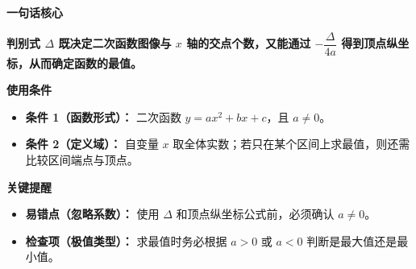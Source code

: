 \begin{summarybox}
	\textbf{\textcolor{CSummary}{一句话核心}}

	\textbf{判别式 $\Delta$ 既决定二次函数图像与 $x$ 轴的交点个数，又能通过 $-\dfrac{\Delta}{4a}$ 得到顶点纵坐标，从而确定函数的最值。}

	\medskip
	\textbf{\textcolor{CSummary}{使用条件}}
	\begin{itemize}[leftmargin=*, itemsep=0.5em, topsep=0.4em]
		\item \textbf{条件 1（函数形式）：} 二次函数 $y=ax^2+bx+c$，且 $a\neq0$。
		\item \textbf{条件 2（定义域）：} 自变量 $x$ 取全体实数；若只在某个区间上求最值，则还需比较区间端点与顶点。
	\end{itemize}

	\medskip
	\textbf{\textcolor{CSummary}{关键提醒}}
	\begin{itemize}[leftmargin=*, itemsep=0.5em, topsep=0.4em]
		\item \textbf{易错点（忽略系数）：} 使用 $\Delta$ 和顶点纵坐标公式前，必须确认 $a\neq0$。
		\item \textbf{检查项（极值类型）：} 求最值时务必根据 $a>0$ 或 $a<0$ 判断是最大值还是最小值。
	\end{itemize}
\end{summarybox}